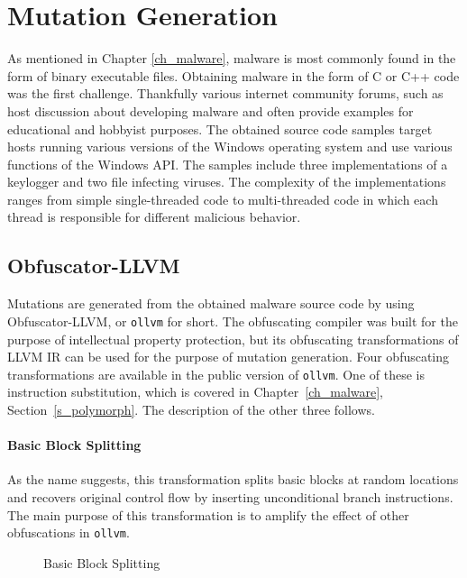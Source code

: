 \section{Mutation Generation}
\label{s_ollvm}
As mentioned in Chapter \ref{ch_malware}, malware is most commonly found in the form of binary executable files. Obtaining malware in the form of C or C++ code was the first challenge. Thankfully various internet community forums, such as \cite{rohitab} host discussion about developing malware and often provide examples for educational and hobbyist purposes. The obtained source code samples target hosts running various versions of the Windows operating system and use various functions of the Windows API. The samples include three implementations of a keylogger and two file infecting viruses. The complexity of the implementations ranges from simple single-threaded code to multi-threaded code in which each thread is responsible for different malicious behavior. 

\subsection{Obfuscator-\textsc{LLVM}}
Mutations are generated from the obtained malware source code by using Obfuscator-\textsc{LLVM}, or \texttt{ollvm} for short. The obfuscating compiler was built for the purpose of intellectual property protection, but its obfuscating transformations of \textsc{LLVM IR} can be used for the purpose of mutation generation. Four obfuscating transformations are available in the public version of \texttt{ollvm}. One of these is instruction substitution, which is covered in Chapter~\ref{ch_malware}, Section~\ref{s_polymorph}. The description of the other three follows.

\paragraph{Basic Block Splitting} As the name suggests, this transformation splits basic blocks at random locations and recovers original control flow by inserting unconditional branch instructions. The main purpose of this transformation is to amplify the effect of other obfuscations in \texttt{ollvm}.

\begin{figure}[H]
    \centering
    \caption{Basic Block Splitting}
    \label{fig_bb_split}
\end{figure}

